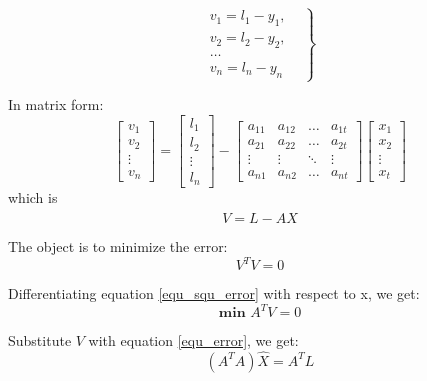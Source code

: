 \begin{equation*}
\left.
  \begin{array}{lr}
    v_1 = l_1 - y_1, &  \\
    v_2 = l_2 - y_2, & \\
    \dots \\
    v_n = l_n - y_n
  \end{array}
\right\}
\end{equation*}

In matrix form:
\begin{equation*}
  \begin{bmatrix}
    v_1 \\
    v_2 \\
    \vdots \\
    v_n
  \end{bmatrix}
  =
  \begin{bmatrix}
    l_1 \\
    l_2 \\
    \vdots \\
    l_n
  \end{bmatrix}
  -
  \begin{bmatrix}
    a_{11} & a_{12} & \ldots & a_{1t} \\
    a_{21} & a_{22} & \ldots & a_{2t} \\
    \vdots & \vdots & \ddots & \vdots \\
    a_{n1} & a_{n2} & \ldots & a_{nt}
  \end{bmatrix}
  \begin{bmatrix}
    x_1 \\
    x_2 \\
    \vdots \\
    x_t
  \end{bmatrix}
\end{equation*}
which is
\begin{equation} \label{equ_error}
V=L-A\hat{X}
\end{equation}

The object is to minimize the error:
\begin{equation} \label{equ_squ_error}
V^TV=0
\end{equation}

Differentiating equation \ref{equ_squ_error} with respect to x, we get:
$$\textbf{min }A^TV=0$$

Substitute $V$ with equation \ref{equ_error}, we get:
\begin{equation*}\label{equ_lsq}
  (A^TA)\hat{X}=A^TL
\end{equation*}

